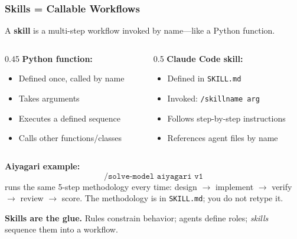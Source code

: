 \documentclass[10pt,english,aspectratio=169]{beamer}
\begin{document}
\begin{frame}
\frametitle{Skills = Callable Workflows}

A \textbf{skill} is a multi-step workflow invoked by name---like a Python function.

\vspace{0.2cm}

\begin{columns}
\begin{column}{0.45\textwidth}
\textbf{Python function:}
\begin{itemize}
    \item Defined once, called by name
    \item Takes arguments
    \item Executes a defined sequence
    \item Calls other functions/classes
\end{itemize}
\end{column}
\begin{column}{0.5\textwidth}
\textbf{Claude Code skill:}
\begin{itemize}
    \item Defined in \texttt{SKILL.md}
    \item Invoked: \texttt{/skillname arg}
    \item Follows step-by-step instructions
    \item References agent files by name
\end{itemize}
\end{column}
\end{columns}

\vspace{0.3cm}

\textbf{Aiyagari example:}
\[
\texttt{/solve-model aiyagari v1}
\]
runs the same 5-step methodology every time: design $\to$ implement $\to$ verify $\to$ review $\to$ score. The methodology is in \texttt{SKILL.md}; you do not retype it.

\vspace{0.2cm}

\textbf{Skills are the glue.} Rules constrain behavior; agents define roles; \textit{skills} sequence them into a workflow.
\end{frame}
\end{document}
